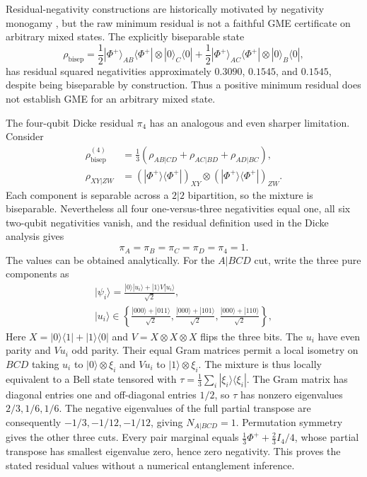 \documentclass[pdflatex,sn-mathphys-num]{sn-jnl}
\begin{document}
Residual-negativity constructions are historically motivated by negativity monogamy \cite{OuFan2007}, but the raw minimum residual is not a faithful GME certificate on arbitrary mixed states. The explicitly biseparable state
\begin{equation}
\rho_{\mathrm{bisep}}=\frac12|\Phi^+\rangle_{AB}\langle\Phi^+|\otimes|0\rangle_C\langle0|
+\frac12|\Phi^+\rangle_{AC}\langle\Phi^+|\otimes|0\rangle_B\langle0|,
\label{eq:biseparable-counterexample}
\end{equation}
has residual squared negativities approximately $0.3090$, $0.1545$, and $0.1545$, despite being biseparable by construction. Thus a positive minimum residual does not establish GME for an arbitrary mixed state.

The four-qubit Dicke residual $\pi_4$ has an analogous and even sharper limitation. Consider
\begin{equation}
\begin{aligned}
\rho_{\mathrm{bisep}}^{(4)}&=\frac13\left(\rho_{AB|CD}+\rho_{AC|BD}+\rho_{AD|BC}\right),\\
\rho_{XY|ZW}&=\left(|\Phi^+\rangle\langle\Phi^+|\right)_{XY}
\otimes\left(|\Phi^+\rangle\langle\Phi^+|\right)_{ZW}.
\end{aligned}
\label{eq:pi4-counterexample}
\end{equation}
Each component is separable across a $2|2$ bipartition, so the mixture is biseparable. Nevertheless all four one-versus-three negativities equal one, all six two-qubit negativities vanish, and the residual definition used in the Dicke analysis gives
\begin{equation}
\pi_A=\pi_B=\pi_C=\pi_D=\pi_4=1.
\end{equation}
The values can be obtained analytically. For the $A|BCD$ cut, write the three pure components as
\begin{equation}
\begin{aligned}
|\psi_i\rangle=\frac{|0\rangle|u_i\rangle+|1\rangle V|u_i\rangle}{\sqrt2},\\
|u_i\rangle\in\left\{
\frac{|000\rangle+|011\rangle}{\sqrt2},
\frac{|000\rangle+|101\rangle}{\sqrt2},
\frac{|000\rangle+|110\rangle}{\sqrt2}\right\},
\end{aligned}
\end{equation}
Here $X=|0\rangle\langle1|+|1\rangle\langle0|$ and $V=X\otimes X\otimes X$ flips the three bits. The $u_i$ have even parity and $Vu_i$ odd parity. Their equal Gram matrices permit a local isometry on $BCD$ taking $u_i$ to $|0\rangle\otimes\xi_i$ and $Vu_i$ to $|1\rangle\otimes\xi_i$. The mixture is thus locally equivalent to a Bell state tensored with $\tau=\frac13\sum_i|\xi_i\rangle\langle\xi_i|$. The Gram matrix has diagonal entries one and off-diagonal entries $1/2$, so $\tau$ has nonzero eigenvalues $2/3,1/6,1/6$. The negative eigenvalues of the full partial transpose are consequently $-1/3,-1/12,-1/12$, giving $N_{A|BCD}=1$. Permutation symmetry gives the other three cuts. Every pair marginal equals $\frac13\Phi^++\frac23 I_4/4$, whose partial transpose has smallest eigenvalue zero, hence zero negativity. This proves the stated residual values without a numerical entanglement inference.
\end{document}
